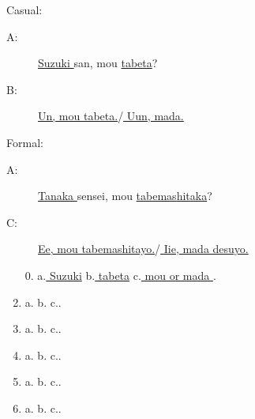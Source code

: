 \documentclass[uplatex,dvipdfmx,b5paper,english,10pt]{jsbook}
\begin{document}
\begin{description}
 \item Casual:
\begin{description}
 \item[A:]  \underline{ Suzuki } san, mou \underline{tabeta}?
 \item[B:] \underline{ Un, mou tabeta.}/\underline{ Uun, mada.}
\end{description}
 \item Formal:
\begin{description}
 \item[A:] \underline{ Tanaka } sensei, mou \underline{tabemashitaka}?
 \item[C:] \underline{ Ee, mou tabemashitayo.}/\underline{ Iie, mada desuyo.}
\end{description}
\end{description}

\begin{enumerate}
  \item[0.] a.\underline{ Suzuki\hspace{6.4zw}} b.\underline{ tabeta\hspace{6.64zw}} c.\underline{ mou or mada \hspace{3.5zw}}.
  \item a.\underline{\hspace{10zw}}  b.\underline{\hspace{10zw}}  c.\underline{\hspace{10zw}}.
  \item a.\underline{\hspace{10zw}}  b.\underline{\hspace{10zw}}  c.\underline{\hspace{10zw}}.
  \item a.\underline{\hspace{10zw}}  b.\underline{\hspace{10zw}}  c.\underline{\hspace{10zw}}.
  \item a.\underline{\hspace{10zw}}  b.\underline{\hspace{10zw}}  c.\underline{\hspace{10zw}}.
  \item a.\underline{\hspace{10zw}}  b.\underline{\hspace{10zw}}  c.\underline{\hspace{10zw}}.
\end{enumerate}
\end{document}

